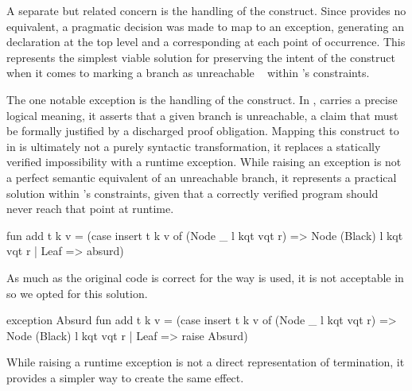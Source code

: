 A separate but related concern is the handling of the  construct. Since \cml provides no equivalent, a pragmatic decision was made to map  
to an exception, generating an  declaration at the top level and a corresponding  at each point of occurrence. This 
represents the simplest viable solution for preserving the intent of the construct when it comes to marking a branch as unreachable ~\cite{Hoare69,Floyd93} within \cml's constraints.

The one notable exception is the handling of the  construct. In \whyml,  carries a precise logical meaning, it asserts that a given branch 
is unreachable, a claim that must be formally justified by a discharged proof obligation. Mapping this construct to  in \cml is ultimately not a purely 
syntactic transformation, it replaces a statically verified impossibility with a runtime exception. While raising an exception is not a perfect semantic equivalent of an 
unreachable branch, it represents a practical solution within \cml's constraints, given that a correctly verified program should never reach that point at runtime.

\begin{cakeml}
    fun add t k v =
        (case insert t k v of
            (Node _ l kqt vqt r) => Node (Black) l kqt vqt r
        | Leaf => absurd)
\end{cakeml}

As much as the original code is correct for the way  is used, it is not acceptable in \cml so we opted for this solution.

\begin{cakeml}
    exception Absurd
    fun add t k v =
        (case insert t k v of
            (Node _ l kqt vqt r) => Node (Black) l kqt vqt r
        | Leaf => raise Absurd)
\end{cakeml}

While raising a runtime exception is not a direct representation of termination, it provides a simpler way to create the same effect.